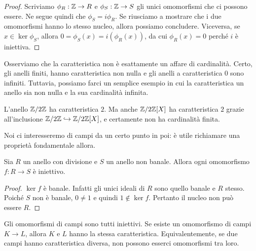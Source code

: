 \begin{proof}
Scriviamo \(\phi_R : \mathbb{Z} \to R\) e \(\phi_S : \mathbb{Z} \to S\) gli unici omomorfismi che ci possono essere. Ne segue quindi che \(\phi_S = i \phi_R\). Se riusciamo a mostrare che i due omomorfismi hanno lo stesso nucleo, allora possiamo concludere. Viceversa, se \(x \in \ker \phi_S\), allora \(0 = \phi_S(x) = i\left(\phi_R(x)\right)\), da cui \(\phi_R(x) = 0\) perché \(i\) è iniettiva.
\end{proof}

Osserviamo che la caratteristica non è esattamente un affare di cardinalità. Certo, gli anelli finiti, hanno caratteristica non nulla e gli anelli a caratteristica \(0\) sono infiniti. Tuttavia, possiamo farci un semplice esempio in cui la caratteristica un anello sia non nulla e la sua cardinalità infinita.

\begin{esem}
L'anello \(\mathbb{Z}/2\mathbb{Z}\) ha caratteristica \(2\). Ma anche \(\mathbb{Z}/2\mathbb{Z}[X]\) ha caratteristica \(2\) grazie all'inclusione \(\mathbb{Z}/2\mathbb{Z} \hookrightarrow \mathbb{Z}/2\mathbb{Z}[X]\), e certamente non ha cardinalità finita.
\end{esem}

Noi ci interesseremo di campi da un certo punto in poi: è utile richiamare una proprietà fondamentale allora.

\begin{prop}\label{prop:OmomorfismiCampiSonoIniettivi}
Sia \(R\) un anello con divisione e \(S\) un anello non banale. Allora ogni omomorfismo \(f : R \to S\) è iniettivo.
\end{prop}

\begin{proof}
\(\ker f\) è banale. Infatti gli unici ideali di \(R\) sono quello banale e \(R\) stesso. Poiché \(S\) non è banale, \(0 \ne 1\) e quindi \(1 \notin \ker f\). Pertanto il nucleo non può essere \(R\).
\end{proof}

\begin{coro}
Gli omomorfismi di campi sono tutti iniettivi. Se esiste un omomorfismo di campi \(K \to L\), allora \(K\) e \(L\) hanno la stessa caratteristica. Equivalentemente, se due campi hanno caratteristica diversa, non possono esserci omomorfismi tra loro.
\end{coro}



